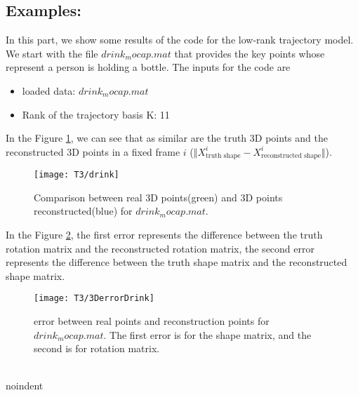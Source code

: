 \subsection{Examples:}
\noindent In this part, we show some results of the code for the low-rank trajectory model.\\ 

\noindent We start with the file \textbf{$drink_mocap.mat$} that provides the key points whose represent a person is holding a bottle. The inputs for the code are\\

\begin{itemize}
\item loaded data: \textbf{$drink_mocap.mat$}
\item Rank of the trajectory basis K: 11
\end{itemize}

\noindent In the Figure \ref{fig:drink}, we can see that as similar are the truth 3D points and the reconstructed 3D points in a fixed frame $i$ ($\Vert X_{\text{truth shape}}^{i}-X_{\text{reconstructed shape}}^{i}\Vert$).\\
\begin{figure}[h]
	\centering
	\texttt{[image: T3/drink]}
	\caption{Comparison between real 3D points(green) and 3D points reconstructed(blue) for \textbf{$drink_mocap.mat$}.}
	\label{fig:drink}
\end{figure}
\noindent In the Figure \ref{fig:drink_error}, the first error represents the difference between the truth rotation matrix and the reconstructed rotation matrix, the second error represents the difference between the truth shape matrix and the reconstructed shape matrix.
\begin{figure}[h]
	\centering
	\texttt{[image: T3/3DerrorDrink]}
	\caption{error between real points and reconstruction points for \textbf{$drink_mocap.mat$}. The first error is for the shape matrix, and the second is for rotation matrix.}
	\label{fig:drink_error}
\end{figure}
\\noindent 